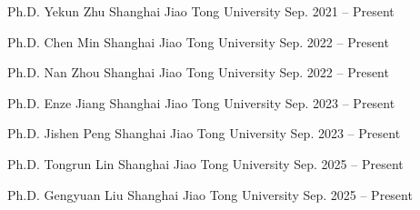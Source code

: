 \begin{cventries}

  \cventry
  {Ph.D.} %
  {Yekun Zhu} %
  {Shanghai Jiao Tong University} %
  {Sep. 2021 -- Present} %
  {}

  \cventry
  {Ph.D.} %
  {Chen Min} %
  {Shanghai Jiao Tong University} %
  {Sep. 2022 -- Present} %
  {}

  \cventry
  {Ph.D.} %
  {Nan Zhou} %
  {Shanghai Jiao Tong University} %
  {Sep. 2022 -- Present} %
  {}

  \cventry
  {Ph.D.} %
  {Enze Jiang} %
  {Shanghai Jiao Tong University} %
  {Sep. 2023 -- Present} %
  {}

  \cventry
  {Ph.D.} %
  {Jishen Peng} %
  {Shanghai Jiao Tong University} %
  {Sep. 2023 -- Present} %
  {}

  \cventry
  {Ph.D.} %
  {Tongrun Lin} %
  {Shanghai Jiao Tong University} %
  {Sep. 2025 -- Present} %
  {}

  \cventry
  {Ph.D.} %
  {Gengyuan Liu} %
  {Shanghai Jiao Tong University} %
  {Sep. 2025 -- Present} %
  {}

\end{cventries}
